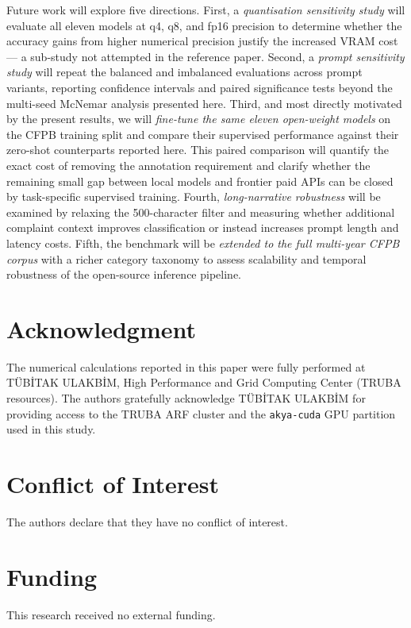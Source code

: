 \documentclass[journal]{IEEEtran}
\begin{document}
Future work will explore five directions.
First, a \emph{quantisation sensitivity study} will evaluate all eleven
models at q4, q8, and fp16 precision to determine whether the accuracy
gains from higher numerical precision justify the increased VRAM cost — a
sub-study not attempted in the reference paper.
Second, a \emph{prompt sensitivity study} will repeat the
balanced and imbalanced evaluations across prompt variants,
reporting confidence intervals and paired significance tests
beyond the multi-seed McNemar analysis presented here.
Third, and most directly motivated by the present results, we will
\emph{fine-tune the same eleven open-weight models} on the CFPB
training split and compare their supervised performance against their
zero-shot counterparts reported here. This paired comparison will
quantify the exact cost of removing the annotation requirement and
clarify whether the remaining small gap between local models and
frontier paid APIs can be closed by task-specific supervised training.
Fourth, \emph{long-narrative robustness} will be examined by relaxing
the 500-character filter and measuring whether additional complaint
context improves classification or instead increases prompt length and
latency costs.
Fifth, the benchmark will be \emph{extended to the full multi-year
CFPB corpus} with a richer category taxonomy to assess scalability
and temporal robustness of the open-source inference pipeline.

\section*{Acknowledgment}
The numerical calculations reported in this paper were fully performed
at T{\"U}B\.{I}TAK ULAKB\.{I}M, High Performance and Grid Computing
Center (TRUBA resources). The authors gratefully acknowledge
T{\"U}B\.{I}TAK ULAKB\.{I}M for providing access to the TRUBA ARF
cluster and the \texttt{akya-cuda} GPU partition used in this study.

\section*{Conflict of Interest}
The authors declare that they have no conflict of interest.

\section*{Funding}
This research received no external funding.
\end{document}
